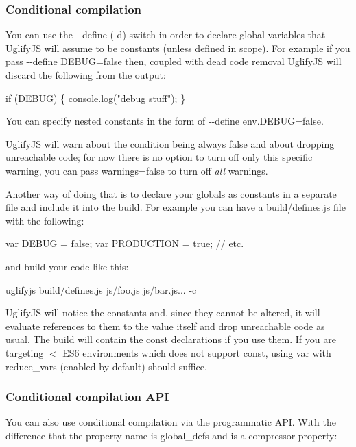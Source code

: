 \subsubsection*{Conditional compilation}

You can use the {\ttfamily -\/-\/define} ({\ttfamily -\/d}) switch in order to declare global variables that Uglify\+JS will assume to be constants (unless defined in scope). For example if you pass {\ttfamily -\/-\/define D\+E\+B\+UG=false} then, coupled with dead code removal Uglify\+JS will discard the following from the output\+: 
\begin{DoxyCode}
if (DEBUG) \{
    console.log("debug stuff");
\}
\end{DoxyCode}


You can specify nested constants in the form of {\ttfamily -\/-\/define env.\+D\+E\+B\+UG=false}.

Uglify\+JS will warn about the condition being always false and about dropping unreachable code; for now there is no option to turn off only this specific warning, you can pass {\ttfamily warnings=false} to turn off {\itshape all} warnings.

Another way of doing that is to declare your globals as constants in a separate file and include it into the build. For example you can have a {\ttfamily build/defines.\+js} file with the following\+: 
\begin{DoxyCode}
var DEBUG = false;
var PRODUCTION = true;
// etc.
\end{DoxyCode}


and build your code like this\+: \begin{DoxyVerb}uglifyjs build/defines.js js/foo.js js/bar.js... -c
\end{DoxyVerb}


Uglify\+JS will notice the constants and, since they cannot be altered, it will evaluate references to them to the value itself and drop unreachable code as usual. The build will contain the {\ttfamily const} declarations if you use them. If you are targeting $<$ E\+S6 environments which does not support {\ttfamily const}, using {\ttfamily var} with {\ttfamily reduce\+\_\+vars} (enabled by default) should suffice.

\subsubsection*{Conditional compilation A\+PI}

You can also use conditional compilation via the programmatic A\+PI. With the difference that the property name is {\ttfamily global\+\_\+defs} and is a compressor property\+:


